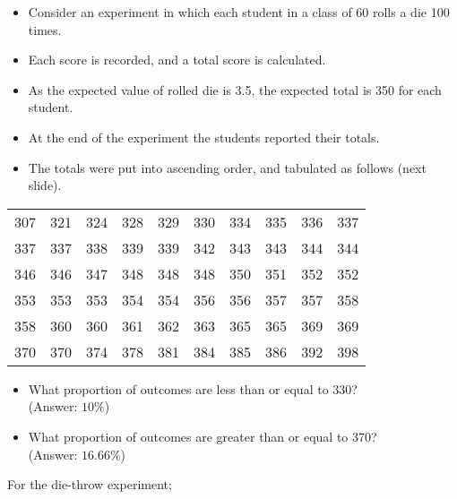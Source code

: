 
\begin{itemize}
\item Consider an experiment in which each student in a class of 60 rolls a die 100 times.
\item Each score is recorded, and a total score is calculated.
\item As the expected value of rolled die is 3.5, the expected total is 350 for each student.
\item At the end of the experiment the students reported their totals.
\item The totals were put into ascending order, and tabulated as follows (next slide).
\end{itemize}

\begin{center}
\begin{tabular}{|c c c c c c c c c c|}
\hline
307 & 321 & 324 & 328 & 329 & 330 & 334 & 335 & 336 &337 \\
337 & 337 & 338 & 339 & 339 & 342 & 343 & 343 & 344 &344 \\
346 & 346 & 347 & 348 & 348 & 348 & 350 & 351 & 352 &352 \\
353 & 353 & 353 & 354 & 354 & 356 & 356 & 357 & 357 &358 \\
358 & 360 & 360 & 361 & 362 & 363 & 365 & 365 & 369 &369 \\
370 & 370 & 374 & 378 & 381 & 384 & 385 & 386 & 392 &398 \\
\hline
\end{tabular}
\end{center}
\normalsize
\begin{itemize}
\item What proportion of outcomes are less than or equal to 330? \\ (Answer: $10\%$)
\item What proportion of outcomes are greater than or equal to 370?\\ (Answer: $16.66\%$)
\end{itemize}

For the die-throw experiment;
%

